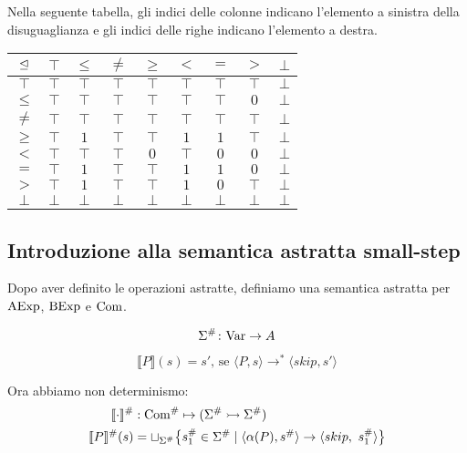 \begin{definizione}
Nella seguente tabella, gli indici delle colonne indicano
l'elemento a sinistra della disuguaglianza e gli indici delle righe
indicano l'elemento a destra.
\end{definizione}

\begin{center}
	\begin{tabular}{ c | c c c c c c c c }
		$\mathrel{\trianglelefteq}$ & $\top$ & $\leq$ & $\neq$ & $\geq$ & $<$ & $=$ & $>$ & $\bot$ \\
		\hline
		$\top$ & $\top$ & $\top$ & $\top$ & $\top$ & $\top$ & $\top$ & $\top$ & $\bot$ \\
		$\leq$ & $\top$ & $\top$ & $\top$ & $\top$ & $\top$ & $\top$ & $0$ & $\bot$ \\
		$\neq$ & $\top$ & $\top$ & $\top$ & $\top$ & $\top$ & $\top$ & $\top$ & $\bot$\\
		$\geq$ & $\top$ & $1$ & $\top$ & $\top$ & $1$ & $1$ & $\top$ & $\bot$ \\
		$<$ & $\top$ & $\top$ & $\top$ & $0$ & $\top$ & $0$ & $0$ & $\bot$\\
		$=$ & $\top$ & $1$ & $\top$ & $\top$ & $1$ & $1$ & $0$ & $\bot$ \\
		$>$ & $\top$ & $1$ & $\top$ & $\top$ & $1$ & $0$ & $\top$ & $\bot$ \\
		$\bot$ & $\bot$ & $\bot$ & $\bot$ & $\bot$ & $\bot$ & $\bot$ & $\bot$ & $\bot$
	\end{tabular}
\end{center}

\subsection{Introduzione alla semantica astratta small-step}
Dopo aver definito le operazioni astratte,
definiamo una semantica astratta per $\mathrm{AExp}$, $\mathrm{BExp}$ e $\mathrm{Com}$.

\begin{definizione}
\[
	\mathord{\Sigma^\#}\colon\mathrm{Var}\to A
\]
\end{definizione}

\begin{definizione}
\[	
	\llbracket P \rrbracket (s) = s' \text{, se } \langle P, s \rangle \rightarrow^* \langle skip, s' \rangle
\]
\end{definizione}

Ora abbiamo non determinismo:
\begin{align*}
	\llbracket \cdot \rrbracket^\# &: \mathrm{Com}^\# \mapsto (\Sigma^\# \rightarrowtail \Sigma^\#) \\
	\llbracket P \rrbracket^\# (s) &=  \sqcup _{\Sigma^\#} \bigl\{ s^\#_1 \in \Sigma^\# \mid \langle \alpha(P), s^\# \rangle \rightarrow \langle skip,\ s^\#_1 \rangle \bigr\}
\end{align*}

